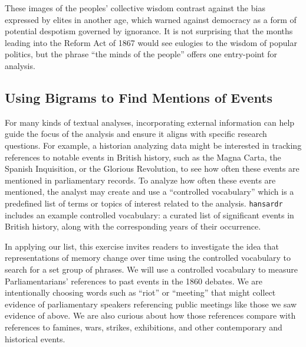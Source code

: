 \documentclass[
]{article}
\begin{document}
These images of the peoples' collective wisdom contrast against the bias
expressed by elites in another age, which warned against democracy as a
form of potential despotism governed by ignorance. It is not surprising
that the months leading into the Reform Act of 1867 would see eulogies
to the wisdom of popular politics, but the phrase ``the minds of the
people'' offers one entry-point for analysis.

\subsection{Using Bigrams to Find Mentions of
Events}\label{using-bigrams-to-find-mentions-of-events}

For many kinds of textual analyses, incorporating external information
can help guide the focus of the analysis and ensure it aligns with
specific research questions. For example, a historian analyzing data
might be interested in tracking references to notable events in British
history, such as the Magna Carta, the Spanish Inquisition, or the
Glorious Revolution, to see how often these events are mentioned in
parliamentary records. To analyze how often these events are mentioned,
the analyst may create and use a ``controlled vocabulary'' which is a
predefined list of terms or topics of interest related to the analysis.
\texttt{hansardr} includes an example controlled vocabulary: a curated
list of significant events in British history, along with the
corresponding years of their occurrence.

In applying our list, this exercise invites readers to investigate the
idea that representations of memory change over time using the
controlled vocabulary to search for a set group of phrases. We will use
a controlled vocabulary to measure Parliamentarians' references to past
events in the 1860 debates. We are intentionally choosing words such as
``riot'' or ``meeting'' that might collect evidence of parliamentary
speakers referencing public meetings like those we saw evidence of
above. We are also curious about how those references compare with
references to famines, wars, strikes, exhibitions, and other
contemporary and historical events.
\end{document}
